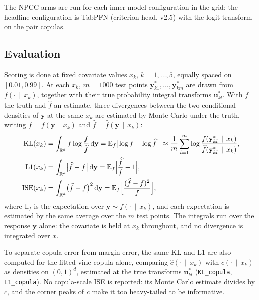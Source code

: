 \documentclass[11pt]{article}
\newcommand{\R}{\mathbb{R}}
\newcommand{\E}{\mathbb{E}}
\newcommand{\dd}{\,\mathrm{d}}
\newcommand{\given}{\,\mid\,}
\begin{document}
The NPCC arms are run for each inner-model configuration in the grid;
the headline configuration is TabPFN (criterion head, v2.5) with the logit
transform on the pair copulas.

\subsection{Evaluation}

Scoring is done at fixed covariate values $x_k$, $k=1,\ldots,5$, equally
spaced on $[0.01,0.99]$. At each $x_k$, $m=1000$ test points
$\mathbf y^\ast_{k1},\ldots,\mathbf y^\ast_{km}$ are drawn from
$f(\cdot \given x_k)$, together with their true probability integral
transforms $\mathbf u^\ast_{kl}$. With $f$ the truth and $\widehat f$ an
estimate, three divergences between the two conditional densities of
$\mathbf y$ at the same $x_k$ are estimated by Monte Carlo under the
truth, writing $f = f(\mathbf y \given x_k)$ and
$\widehat f = \widehat f(\mathbf y \given x_k)$:
\begin{align}
  \mathrm{KL}(x_k)
  &= \int_{\R^d} f \log\frac{f}{\widehat f}\dd\mathbf y
  = \E_f\bigl[\log f - \log \widehat f\,\bigr]
  \approx \frac1m \sum_{l=1}^m
    \log\frac{f(\mathbf y^\ast_{kl} \given x_k)}
             {\widehat f(\mathbf y^\ast_{kl} \given x_k)},
  \label{eq:vine-kl}\\
  \mathrm{L1}(x_k)
  &= \int_{\R^d} \bigl|\widehat f - f\bigr|\dd\mathbf y
  = \E_f\Bigl|\frac{\widehat f}{f} - 1\Bigr|,
  \label{eq:vine-l1}\\
  \mathrm{ISE}(x_k)
  &= \int_{\R^d} \bigl(\widehat f - f\bigr)^2\dd\mathbf y
  = \E_f\Bigl[\frac{(\widehat f - f)^2}{f}\Bigr],
  \label{eq:vine-ise}
\end{align}
where $\E_f$ is the expectation over $\mathbf y \sim f(\cdot \given x_k)$,
and each expectation is estimated by the same average over the $m$ test
points. The integrals run over the response $\mathbf y$ alone: the
covariate is held at $x_k$ throughout, and no divergence is integrated
over $x$.

To separate copula error from margin error, the same KL and L1 are also
computed for the fitted vine copula alone, comparing
$\widehat c(\cdot \given x_k)$ with $c(\cdot \given x_k)$ as densities on
$(0,1)^d$, estimated at the true transforms $\mathbf u^\ast_{kl}$
(\texttt{KL\_copula}, \texttt{L1\_copula}). No copula-scale ISE is
reported: its Monte Carlo estimate divides by $c$, and the corner peaks of
$c$ make it too heavy-tailed to be informative.
\end{document}
